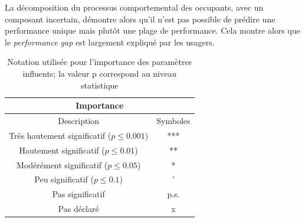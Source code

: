 La décomposition du processus comportemental des occupants, avec un composant incertain, démontre alors qu'il n'est pas possible de prédire une performance unique mais plutôt une plage de performance. Cela montre alors que le \textit{performance gap} est largement expliqué par les usagers.

\begin{table}
\begin{center}
\begin{tabular}{|c|c|}
\hline
\multicolumn{2}{|c|}{\textbf{Importance}} \\
\hline
\hline Description & Symboles \\
\hline Très hautement significatif ($p\leq 0.001$) & \cellcolor{OliveGreen} *** \\
\hline Hautement significatif ($p\leq 0.01$) & \cellcolor{LimeGreen} ** \\
\hline Modérément significatif ($p\leq 0.05$) & \cellcolor{yellow} * \\
\hline Peu significatif ($p\leq 0.1$) & \cellcolor{orange} ' \\
\hline Pas significatif & \cellcolor{red} p.s. \\
\hline Pas déclaré & \cellcolor{gray} x \\
\hline
\end{tabular}
\caption{Notation utilisée pour l'importance des paramètres influents; la valeur p correspond au niveau statistique}
\label{tab:drivingforce}
\end{center}
\end{table}

